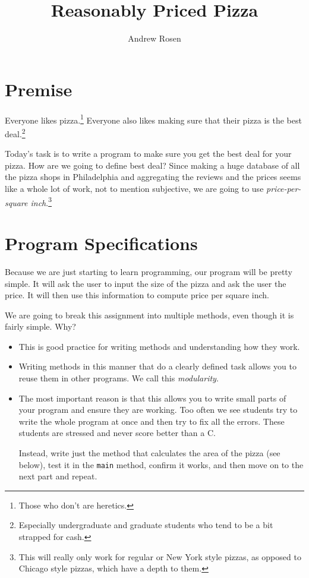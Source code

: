 \documentclass[10pt,letterpaper]{article}
\author{Andrew Rosen}
\title{Reasonably Priced Pizza}
\date{}
\begin{document}
	
	\maketitle
	\section{Premise}
	Everyone likes pizza.\footnote{Those who don't are heretics.}
	Everyone also likes making sure that their pizza is the best deal.\footnote{Especially undergraduate and graduate students who tend to be a bit strapped for cash.}
	
	Today's task is to write a program to make sure you get the best deal for your pizza.
	How are we going to define best deal? 
	Since making a huge database of all the pizza shops in Philadelphia and aggregating the reviews and the prices seems like a whole lot of work, not to mention subjective, we are going to use \textit{price-per-square inch}.\footnote{This will really only work for regular or New York style pizzas, as opposed to Chicago style pizzas, which have a depth to them.}

	\section{Program Specifications} 
	
	Because we are just starting to learn programming, our program will be pretty simple.
	It will ask the user to input the size of the pizza and ask the user the price.
	It will then use this information to compute price per square inch.
	
	We are going to break this assignment into multiple methods, even though it is fairly simple.
	Why?
	\begin{itemize}
		\item This is good practice for writing methods and understanding how they work.
		\item Writing methods in this manner that do a clearly defined task allows you to reuse them in other programs.  We call this \textit{modularity}.
		\item The most important reason is that this allows you to write small parts of your program and ensure they are working.  
		Too often we see students try to write the whole program at once and then try to fix all the errors.  
		These students are stressed and never score better than a C.
		
		Instead, write just the method that calculates the area of the pizza (see below), test it in the \texttt{main} method, confirm it works, and then move on to the next part and repeat.
	\end{itemize}
	
\end{document}
